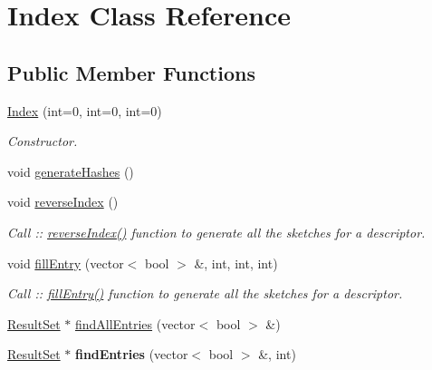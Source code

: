 \hypertarget{classIndex}{\section{\-Index \-Class \-Reference}
\label{classIndex}
}
\subsection*{\-Public \-Member \-Functions}
\begin{DoxyCompactItemize}
\item 
\hypertarget{classIndex_a25ad808f35997941d138c5b1e7cde441}{\hyperlink{classIndex_a25ad808f35997941d138c5b1e7cde441}{\-Index} (int=0, int=0, int=0)}\label{classIndex_a25ad808f35997941d138c5b1e7cde441}

\begin{DoxyCompactList}\small\item\em \-Constructor. \end{DoxyCompactList}\item 
void \hyperlink{classIndex_ad4569374473db6e4180e7f5e5cbe1cf6}{generate\-Hashes} ()
\item 
\hypertarget{classIndex_a98ce1753ab600b67d85dae0b01020b0d}{void \hyperlink{classIndex_a98ce1753ab600b67d85dae0b01020b0d}{reverse\-Index} ()}\label{classIndex_a98ce1753ab600b67d85dae0b01020b0d}

\begin{DoxyCompactList}\small\item\em \-Call \-:\-: \hyperlink{classIndex_a98ce1753ab600b67d85dae0b01020b0d}{reverse\-Index()} function to generate all the sketches for a descriptor. \end{DoxyCompactList}\item 
\hypertarget{classIndex_a3132e2144d7549df4697db885be653e3}{void \hyperlink{classIndex_a3132e2144d7549df4697db885be653e3}{fill\-Entry} (vector$<$ bool $>$ \&, int, int, int)}\label{classIndex_a3132e2144d7549df4697db885be653e3}

\begin{DoxyCompactList}\small\item\em \-Call \-:\-: \hyperlink{classIndex_a3132e2144d7549df4697db885be653e3}{fill\-Entry()} function to generate all the sketches for a descriptor. \end{DoxyCompactList}\item 
\hyperlink{classResultSet}{\-Result\-Set} $\ast$ \hyperlink{classIndex_a7d5c9e47037fc4685fc71acab1544b43}{find\-All\-Entries} (vector$<$ bool $>$ \&)
\item 
\hypertarget{classIndex_aa9c882998bed9437303b41b377ccc330}{\hyperlink{classResultSet}{\-Result\-Set} $\ast$ {\bfseries find\-Entries} (vector$<$ bool $>$ \&, int)}\label{classIndex_aa9c882998bed9437303b41b377ccc330}

\end{DoxyCompactItemize}
